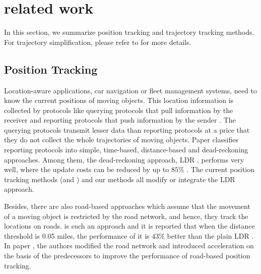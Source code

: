 
\section{related work}
\label{sec-related}

In this section, we summarize position tracking and trajectory tracking methods. For trajectory simplification, please refer to \cite{Zhang:Evaluation, Lin:Cised} for more details.

\subsection{{Position Tracking}}

Location-aware applications, \eg car navigation or fleet management systems, need to know the current positions of moving objects. 
This location information is collected by protocols like querying protocols that pull information by the receiver and reporting protocols that push information by the sender \cite{Leonhardi:Comparison}.
The querying protocols transmit lesser data than reporting protocols at a price that they do not collect the whole trajectories of moving objects.
Paper \cite{Leonhardi:Comparison} classifies reporting protocols into simple, time-based, distance-based and dead-reckoning approaches. Among them, the dead-reckoning approach, \textcolor{blue}{\eg} LDR \cite{Wolfson:PositionTracking, Wolfson:PlainDR}, performs very well, where the update costs can be reduced by up to $85\%$ \cite{Wolfson:PositionTracking}. The current position tracking methods (\ldrh and \grts) and our methods all modify or integrate the LDR approach.

Besides, there are also road-based approaches \cite{Civilis:Techniques, Civilis:RoadTracking, Wolfson:RoadTracking} which assume that the movement of a moving object is restricted by the road network, and hence, they track the locations on roads. \cite{Wolfson:RoadTracking} is such an approach and it is reported that when the distance threshold is 0.05 miles, the performance of it is $43\%$ better than the plain LDR \cite{Wolfson:PlainDR}. 
In paper \cite{Civilis:Techniques}, the authors modified the road network and introduced acceleration on the basis of the predecessors to improve the performance of road-based position tracking.

